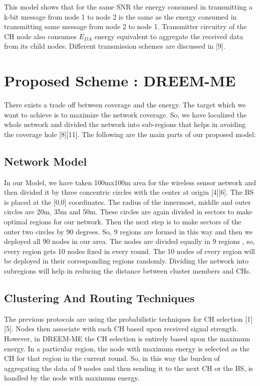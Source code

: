 \documentclass[journal]{IEEEtran}
\begin{document}
This model shows that for the same SNR the energy consumed in transmitting a k-bit message from node 1 to node 2 is the same as the energy consumed in transmitting same message from node 2 to node 1. Transmitter circuitry of the CH node also consumes $E_{DA}$ energy equivalent to aggregate the received data from its child nodes. Different transmission schemes are discussed in [9].

\section{Proposed Scheme : DREEM-ME}
There exists a trade off between coverage and the energy. The target which we want to achieve is to maximize the network coverage. So, we have localized the whole network and divided the network into sub-regions that helps in avoiding the coverage hole [8][11]. The following are the main parts of our proposed model:

\subsection{Network Model}

In our Model, we have taken 100mx100m area for the wireless sensor network and then divided it by three concentric circles with the center at origin [4][6]. The BS is placed at the [0,0] coordinates. The radius of the innermost, middle and outer circles are 20m, 35m and 50m. These circles are again divided in sectors to make optimal regions for our network. Then the next step is to make sectors of the outer two circles by 90 degrees. So, 9 regions are formed in this way and then we deployed all 90 nodes in our area. The nodes are divided equally in 9 regions , so, every region gets 10 nodes fixed in every round. The 10 nodes of every region will be deployed in their corresponding regions randomly. Dividing the network into subregions will help in reducing the distance between cluster members and CHs.

\subsection{ Clustering And Routing Techniques }

The previous protocols are using the probabilistic techniques for CH selection [1][5]. Nodes then associate with each CH based upon received signal strength. However, in DREEM-ME the CH selection is entirely based upon the maximum energy. In a particular region, the node with maximum energy is selected as the CH for that region in the current round. So, in this way the burden of aggregating the data of 9 nodes and then sending it to the next CH or the BS, is handled by the node with maximum energy.
\end{document}
